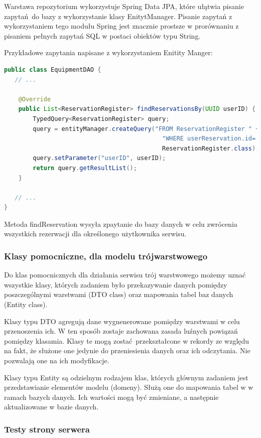 \documentclass{article}
\begin{document}
Warstawa repozytorium wykorzystuje Spring Data JPA, które ułątwia pisanie zapytań do bazy z wykorzystanie klasy EnitytManager. Pisanie zapytań z wykorzystaniem
tego modułu Spring jest znacznie prostsze w prorównaniu z pisaniem pełnych zapytań SQL w postaci obiektów typu String. 

Przykładowe zapytania napisane z wykorzystaniem Enitity Manger:
\begin{lstlisting}[language=Java, breaklines=true, caption=Przykładowy zapytanie do bazy z warstwy repozytorium, label=lst:wr]
public class EquipmentDAO {
   // ...

    @Override
    public List<ReservationRegister> findReservationsBy(UUID userID) {
        TypedQuery<ReservationRegister> query;
        query = entityManager.createQuery("FROM ReservationRegister " +
                                            "WHERE userReservation.id=:userID",
                                            ReservationRegister.class);
        query.setParameter("userID", userID);
        return query.getResultList();
    }

   // ...
}
\end{lstlisting}

Metoda findReservation wysyła zpaytanie do bazy danych w celu zwrócenia wszystkich rezerwacji dla określonego użytkownika serwisu.


\subsubsection{Klasy pomocniczne, dla modelu trójwarstwowego}

Do klas pomocnicznych dla działania serwisu trój warstwowego możemy uznać wszystkie klasy, których zadaniem było przekazywanie danych pomiędzy poszczególnymi
warstwami (DTO class) oraz mapowania tabel baz danych (Entity class).

Klasy typu DTO agregują dane wygnenerowane pomiędzy warstwami w celu przenoszenia ich. W ten sposób zostaje zachowana zasada luźnych powiązań pomiędzy klasamia.
Klasy te mogą zostać przekształcone w rekordy ze względu na fakt, że służone one jedynie do przeniesienia danych oraz ich odczytania. Nie pozwalają one na ich modyfikacje.

Klasy typu Entity są odzielnym rodzajem klas, których głównym zadaniem jest przedstawianie elementów modelu (domeny). Służą one do mapowania tabel w w ramach bazych danych.
Ich wartości mogą być zmieniane, a następnie aktualizowane w bazie danych.

\subsubsection{Testy strony serwera}
\end{document}
